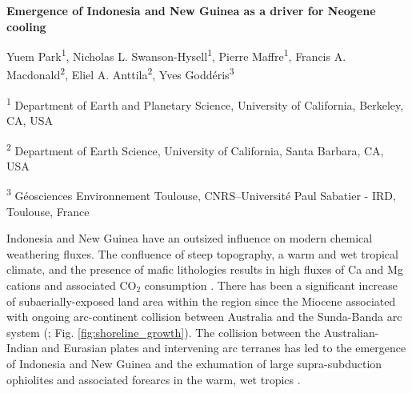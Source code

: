 \documentclass[11pt,letterpaper]{article}
\newcommand{\COtwo}{CO$_{2}$\xspace}
\begin{document}
\begin{flushleft}
{\Large \textbf{Emergence of Indonesia and New Guinea as a driver for Neogene cooling}}

Yuem Park\textsuperscript{1},
Nicholas L. Swanson-Hysell\textsuperscript{1},
Pierre Maffre\textsuperscript{1},
Francis A. Macdonald\textsuperscript{2},
Eliel A. Anttila\textsuperscript{2},
Yves Godd\'eris\textsuperscript{3}

\bigskip
\textsuperscript{1} Department of Earth and Planetary Science, University of California, Berkeley, CA, USA

\textsuperscript{2} Department of Earth Science, University of California, Santa Barbara, CA, USA

\textsuperscript{3} G\'eosciences Environnement Toulouse, CNRS--Universit\'e Paul Sabatier - IRD, Toulouse, France

\bigskip

\end{flushleft}

\linenumbers

Indonesia and New Guinea have an outsized influence on modern chemical weathering fluxes. The confluence of steep topography, a warm and wet tropical climate, and the presence of mafic lithologies results in high fluxes of Ca and Mg cations and associated \COtwo consumption \citep{Gaillardet1999a, Hartmann2009a, Hartmann2014a}. There has been a significant increase of subaerially-exposed land area within the region since the Miocene associated with ongoing arc-continent collision between Australia and the Sunda-Banda arc system (\citealp{Molnar2015a, Hall2017a}; Fig. \ref{fig:shoreline_growth}). The collision between the Australian-Indian and Eurasian plates and intervening arc terranes has led to the emergence of Indonesia and New Guinea and the exhumation of large supra-subduction ophiolites and associated forearcs in the warm, wet tropics \citet{Macdonald2019a}.
\end{document}
